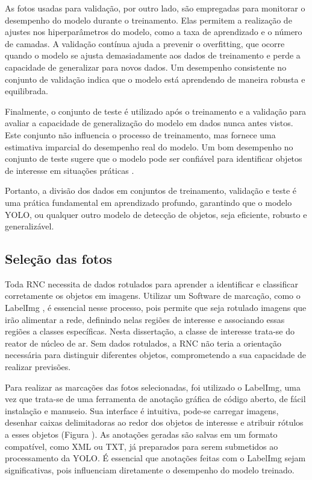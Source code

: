 As fotos usadas para validação, por outro lado, são empregadas para monitorar o desempenho do modelo durante o treinamento. Elas permitem a realização de ajustes nos hiperparâmetros do modelo, como a taxa de aprendizado e o número de camadas. A validação contínua ajuda a prevenir o overfitting, que ocorre quando o modelo se ajusta demasiadamente aos dados de treinamento e perde a capacidade de generalizar para novos dados. Um desempenho consistente no conjunto de validação indica que o modelo está aprendendo de maneira robusta e equilibrada.

Finalmente, o conjunto de teste é utilizado após o treinamento e a validação para avaliar a capacidade de generalização do modelo em dados nunca antes vistos. Este conjunto não influencia o processo de treinamento, mas fornece uma estimativa imparcial do desempenho real do modelo. Um bom desempenho no conjunto de teste sugere que o modelo pode ser confiável para identificar objetos de interesse em situações práticas \cite{goodfellow2016deep}.

Portanto, a divisão dos dados em conjuntos de treinamento, validação e teste é uma prática fundamental em aprendizado profundo, garantindo que o modelo YOLO, ou qualquer outro modelo de detecção de objetos, seja eficiente, robusto e generalizável.

\subsection{Seleção das fotos}

Toda RNC necessita de dados rotulados para aprender a identificar e classificar corretamente os objetos em imagens. Utilizar um Software de marcação, como o LabelImg \cite{labelimg}, é essencial nesse processo, pois permite que seja rotulado imagens que irão alimentar a rede, definindo nelas regiões de interesse e associando essas regiões a classes específicas. Nesta dissertação, a classe de interesse trata-se do reator de núcleo de ar. Sem dados rotulados, a RNC não teria a orientação necessária para distinguir diferentes objetos, comprometendo a sua capacidade de realizar previsões.

Para realizar as marcações das fotos selecionadas, foi utilizado o LabelImg, uma vez que trata-se de uma ferramenta de anotação gráfica de código aberto, de fácil instalação e manuseio. Sua interface é intuitiva, pode-se carregar imagens, desenhar caixas delimitadoras ao redor dos objetos de interesse e atribuir rótulos a esses objetos (Figura \cite{fig:reator-marcado}). As anotações geradas são salvas em um formato compatível, como XML ou TXT, já preparados para serem submetidos ao processamento da YOLO. É essencial que anotações feitas com o LabelImg sejam significativas, pois influenciam diretamente o desempenho do modelo treinado.


